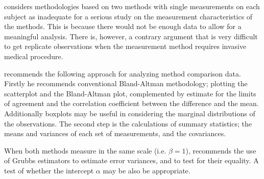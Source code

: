 \documentclass[12pt, a4paper]{report}
\begin{document}
	
	\citet{DunnSEME} considers methodologies based on two methods with single measurements on each subject as inadequate for a serious study
	on the measurement characteristics of the methods. This is because there would not be enough data to allow for a meaningful analysis.
	There is, however, a contrary argument that is very difficult to get replicate
	observations when the measurement method requires invasive medical procedure.
	
	\citet{DunnSEME} recommends the following approach for analyzing
	method comparison data. Firstly he recommends conventional
	Bland-Altman methodology; plotting the scatterplot and the
	Bland-Altman plot, complemented by estimate for the limits of
	agreement and the correlation coefficient between the difference
	and the mean. Additionally boxplots may be useful in considering
	the marginal distributions of the observations. The second step is
	the calculations of summary statistics; the means and variances of
	each set of measurements, and the covariances.
	
	When both methods measure in the same scale (i.e. $\beta = 1$),
	\citet{DunnSEME} recommends the use of Grubbs estimators to
	estimate error variances, and to test for their equality. A test
	of whether the intercept $\alpha$ may be also be appropriate.
	
	
	
	
	
	
	
\end{document}
